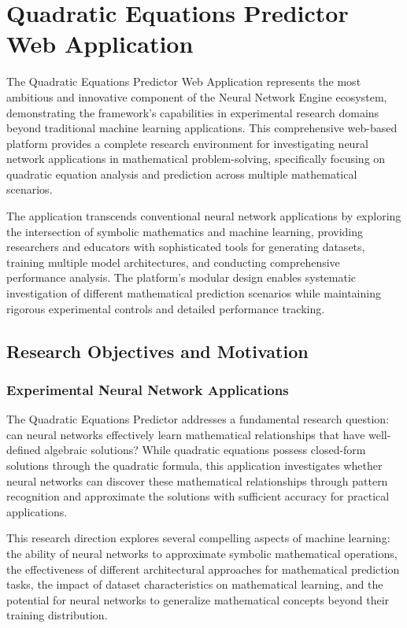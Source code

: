 \documentclass[11pt,a4paper]{report}
\begin{document}
\section{Quadratic Equations Predictor Web Application}

The Quadratic Equations Predictor Web Application represents the most ambitious and innovative component of the Neural Network Engine ecosystem, demonstrating the framework's capabilities in experimental research domains beyond traditional machine learning applications. This comprehensive web-based platform provides a complete research environment for investigating neural network applications in mathematical problem-solving, specifically focusing on quadratic equation analysis and prediction across multiple mathematical scenarios.

The application transcends conventional neural network applications by exploring the intersection of symbolic mathematics and machine learning, providing researchers and educators with sophisticated tools for generating datasets, training multiple model architectures, and conducting comprehensive performance analysis. The platform's modular design enables systematic investigation of different mathematical prediction scenarios while maintaining rigorous experimental controls and detailed performance tracking.

\subsection{Research Objectives and Motivation}

\subsubsection{Experimental Neural Network Applications}

The Quadratic Equations Predictor addresses a fundamental research question: can neural networks effectively learn mathematical relationships that have well-defined algebraic solutions? While quadratic equations possess closed-form solutions through the quadratic formula, this application investigates whether neural networks can discover these mathematical relationships through pattern recognition and approximate the solutions with sufficient accuracy for practical applications.

This research direction explores several compelling aspects of machine learning: the ability of neural networks to approximate symbolic mathematical operations, the effectiveness of different architectural approaches for mathematical prediction tasks, the impact of dataset characteristics on mathematical learning, and the potential for neural networks to generalize mathematical concepts beyond their training distribution.
\end{document}
